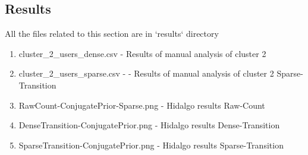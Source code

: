 \documentclass{article}
\begin{document}
\subsection{Results}
All the files related to this section are in `results` directory
\begin{enumerate}
    \item cluster\_2\_users\_dense.csv - Results of manual analysis of cluster 2
    \item cluster\_2\_users\_sparse.csv - - Results of manual analysis of cluster 2 Sparse-Transition
    \item RawCount-ConjugatePrior-Sparse.png - Hidalgo results Raw-Count
    \item DenseTransition-ConjugatePrior.png - Hidalgo results Dense-Transition
    \item SparseTransition-ConjugatePrior.png - Hidalgo results Sparse-Transition
\end{enumerate}
\end{document}
